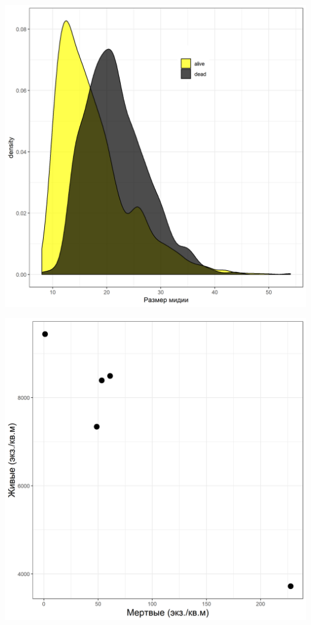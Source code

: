 \documentclass[a0,portrait]{a0poster}
\begin{document}
\begin{multicols}{2}
%
\begin{minipage}[t]{0.46\linewidth}		
	\begin{center}\vspace{0.1cm}
			\includegraphics[width=0.9\linewidth]{Size_dist_hem.png}
			\label{Fig_siz_hem}
		\end{center}\vspace{0.5cm}
\end{minipage}\hspace{1cm}
%
\begin{minipage}[t]{0.46\linewidth}		
	\begin{center}\vspace{0.1cm}
			\includegraphics[width=0.9\linewidth]{N_dead_N_alive_hem.png}

\end{center}
\end{minipage}
\end{multicols}
\end{document}
